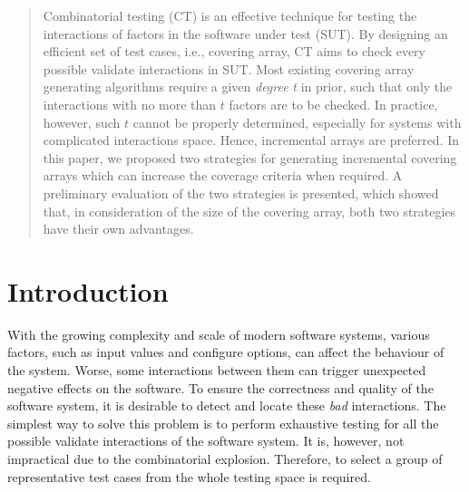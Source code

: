 \documentclass[conference]{IEEEtran}
\theoremstyle{definition}
\begin{document}




\maketitle


\begin{abstract}
Combinatorial testing (CT) is an effective technique for testing the interactions of factors in the software under test (SUT). By designing an efficient set of test cases, i.e., covering array, CT aims to check every possible validate interactions in SUT. Most existing covering array generating algorithms require a given \emph{degree} \emph{t} in prior, such that only the interactions with no more than $t$ factors are to be checked.  In practice, however, such $t$ cannot be properly determined, especially for systems with complicated interactions space.  Hence, incremental arrays are preferred. In this paper, we proposed two strategies for generating incremental covering arrays which can increase the coverage criteria when required. A preliminary evaluation of the two strategies is presented, which showed that, in consideration of the size of the covering array, both two strategies have their own advantages.
\end{abstract}





%
\IEEEpeerreviewmaketitle



\section{Introduction}
With the growing complexity and scale of modern software systems, various factors, such as input values and configure options, can affect the behaviour of the system. Worse, some interactions between them can trigger unexpected negative effects on the software. To ensure the correctness and quality of the software system, it is desirable to detect and locate these \emph{bad} interactions. The simplest way to solve this problem is to perform exhaustive testing for all the possible validate interactions of the software system. It is, however, not impractical due to the combinatorial explosion. Therefore, to select a group of representative test cases from the whole testing space is required.
\end{document}
